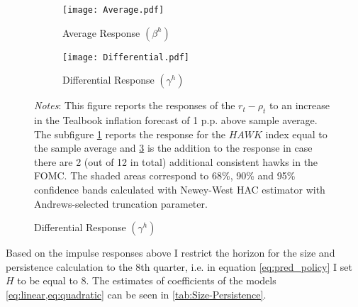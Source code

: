 \documentclass[12pt]{article}
\numberwithin{equation}{section}
\begin{document}
\begin{figure}[!htbp]\centering
    \caption{Policy Response to Inflation and FOMC Hawkishness}\vspace{2ex}
    \label{fig:LP}
    \begin{subfigure}[b]{0.49\textwidth}
        \centering
        \caption{Average Response $(\beta^h)$}
        \label{fig:AverageResponce}
        \texttt{[image: Average.pdf]}
    \end{subfigure}
    \hfill
    \begin{subfigure}[b]{0.49\textwidth}
        \centering
        \caption{Differential Response $(\gamma^h)$}
        \label{fig:DifferentialResponce}
        \texttt{[image: Differential.pdf]}
    \end{subfigure}
        {\begin{flushleft}\scriptsize\textit{Notes}: This figure reports the responses of the $r_t-\rho_t$ to an increase in the Tealbook inflation forecast of 1 p.p. above sample average. The subfigure \ref{fig:AverageResponce} reports the response for the $\mathit{HAWK}$ index equal to the sample average and \ref{fig:DifferentialResponce} is the addition to the response in case there are 2 (out of 12 in total) additional consistent hawks in the FOMC. The shaded areas correspond to 68\%, 90\% and 95\% confidence bands calculated with Newey-West HAC estimator with Andrews-selected truncation parameter.\end{flushleft}}
\end{figure}

Based on the impulse responses above I restrict the horizon for the size and persistence calculation to the 8th quarter, i.e. in equation \eqref{eq:pred_policy} I set $H$ to be equal to 8. The estimates of coefficients of the models \vref{eq:linear,eq:quadratic} can be seen in \vref{tab:Size-Persistence}.
\end{document}
